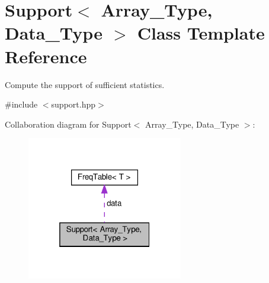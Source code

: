 \hypertarget{class_support}{}\section{Support$<$ Array\+\_\+\+Type, Data\+\_\+\+Type $>$ Class Template Reference}
\label{class_support}


Compute the support of sufficient statistics.  




{\ttfamily \#include $<$support.\+hpp$>$}



Collaboration diagram for Support$<$ Array\+\_\+\+Type, Data\+\_\+\+Type $>$\+:\nopagebreak
\begin{figure}[H]
\begin{center}
\leavevmode
\includegraphics[width=193pt]{class_support__coll__graph}
\end{center}
\end{figure}
